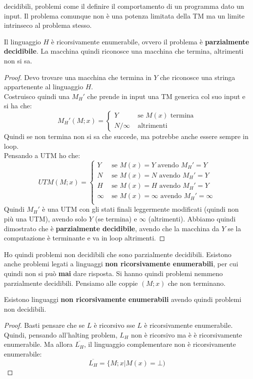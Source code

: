 decidibili, problemi come il definire il comportamento di un programma dato un
input. Il problema comunque non è una potenza limitata della TM ma un limite
intrinseco al problema stesso.
\begin{teorema}
  Il linguaggio $H$ è ricorsivamente enumerabile, ovvero il problema è
  \textbf{parzialmente decidibile}. La macchina quindi riconosce una macchina
  che termina, altrimenti non si sa.  
\end{teorema}
\begin{proof}
  Devo trovare una macchina che termina in $Y$ che riconosce una stringa
  appartenente al linguaggio $H$.\\
  Costruisco quindi una $M_H'$ che prende in input una TM generica col suo
  input e si ha che:
  \[M_H'(M;x)=
   \begin{cases}
     Y &\mbox{ se } M(x)\mbox{ termina}\\
     N/\infty &\mbox{ altrimenti}
    \end{cases}
  \]
  Quindi se non termina non si sa che succede, ma potrebbe anche essere sempre
  in loop.\\
  Pensando a UTM ho che:
  \[UTM(M;x)=
   \begin{cases}
     Y &\mbox{ se } M(x)=Y\mbox{ avendo }M_H'=Y\\
     N &\mbox{ se } M(x)=N\mbox{ avendo }M_H'=Y\\
     H &\mbox{ se } M(x)=H\mbox{ avendo }M_H'=Y\\
     \infty &\mbox{ se } M(x)=\infty\mbox{ avendo }M_H'=\infty\\
    \end{cases}
  \]
  Quindi $M_H'$ è una UTM con gli stati finali leggermente modificati (quindi
  non più una UTM), avendo
  solo $Y$ (se termina) e $\infty$ (altrimenti). Abbiamo quindi dimostrato che è
  \textbf{parzialmente decidibile}, avendo che la macchina da $Y$ se la
  computazione è terminante e va in loop altrimenti.
\end{proof}
Ho quindi problemi non decidibili che sono parzialmente decidibili. Esistono
anche problemi legati a linguaggi \textbf{non ricorsivamente enumerabili}, per
cui quindi non si può \textbf{mai} dare risposta. Si hanno quindi problemi
nemmeno parzialmente decidibili. Pensiamo alle coppie $(M;x)$ che non terminano.
\begin{teorema}
   Esistono linguaggi \textbf{non ricorsivamente enumerabili} avendo quindi
   problemi non decidibili.
\end{teorema}
\begin{proof}
  Basti pensare che se $L$ è ricorsivo sse $L$ è ricorsivamente
  enumerabile. Quindi, pensando all'halting problem, $L_H$ non è ricorsivo ma è
  è ricorsivamente enumerabile. Ma allora $\overline{L_H}$, il linguaggio
  complementare non è ricorsivamente enumerabile: 
  \[\overline{L_H}=\{M;x|M(x)=\bot)\]
\end{proof}
